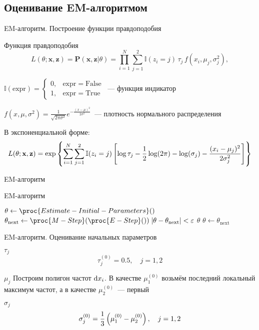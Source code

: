 \documentclass[utf8]{beamer}
\begin{document}
\subsection[EM-алгоритм]{Оценивание EM-алгоритмом}
\begin{frame}{EM-алгоритм. Построение функции правдоподобия}
\begin{block}{Функция правдоподобия}
  $$
  L(\theta; \mathbf{x}, \mathbf{z}) = 
    \mathbf{P}(\mathbf{x}, \mathbf{z} \vert \theta) = 
    \prod\limits_{i=1}^{N} \sum\limits_{j=1}^2 
      \mathbb{I}(z_i=j) \, \tau_j \, f(x_i,\mu_j,\sigma_j^2),
  $$

{\footnotesize
$\mathbb{I}(\mathrm{expr}) = \left\{
  \begin{array}{rl}
    0, & \mathrm{expr} = \mathrm{False} \\
    1, & \mathrm{expr} = \mathrm{True}
  \end{array}\right.$~--- функция индикатор

$f(x, \mu, \sigma^2) = 
    \frac{1}{\sqrt{2 \pi \sigma^2}} e^{-\frac{(x - \mu)^2}{2 \sigma^2}}$~---
плотность нормального распределения
}
\end{block}

В экспоненциальной форме:
{\small
$$
L(\theta; \mathbf{x}, \mathbf{z}) =
  \exp \cbr{ \sum\limits_{i=1}^{N} \sum\limits_{j=1}^2 
    \mathbb{I}(z_i=j) \sbr{
      \log \tau_j - 
      \frac{1}{2}\log(2\pi) -
      \log(\sigma_j) -
      \frac{(x_i - \mu_j)^2}{2 \sigma_j^2}}}
$$}
\end{frame}


\begin{frame}{EM-алгоритм}
\begin{block}{EM-алгоритм}
\begin{codebox}
\li $\theta \gets \proc{Estimate-Initial-Parameters}()$
\li \While {}
\li \Do
      $\theta_{\mathrm{next}} \gets \proc{M-Step}(\proc{E-Step}())$
\li   \If $\envert{\theta - \theta_{\mathrm{next}}} < \varepsilon$
\li   \Then
        \Return $\theta$
\li   \Else
        $\theta \gets \theta_{\mathrm{next}}$
      \End
    \End
\end{codebox}
\end{block}
\end{frame}


\begin{frame}{EM-алгоритм. Оценивание начальных параметров}
\begin{block}{$\tau_j$}
$$
\tau_j^{(0)} = 0.5, \quad j=1,2
$$
\end{block}
\begin{block}{$\mu_j$}
Построим полигон частот $\dif x_i$.
В качестве $\mu_1^{(0)}$ возьмём последний локальный максимум частот,
а в качестве $\mu_2^{(0)}$~--- первый
\end{block}
\begin{block}{$\sigma_j$}
$$\sigma_j^{(0)} = \frac{1}{3}\del{\mu_1^{(0)} - \mu_2^{(0)}}, \quad j=1, 2$$
\end{block}
\end{frame}
\end{document}
